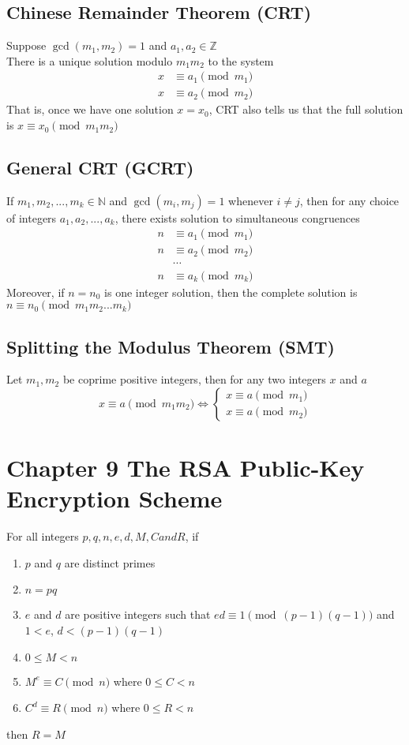 \documentclass[12pt, letterpaper]{article}
\begin{document}
\subsection{Chinese Remainder Theorem (CRT)}
Suppose $\gcd(m_1, m_2) = 1$ and $a_1, a_2 \in \mathbb{Z}$ \\
There is a unique solution modulo $m_1m_2$ to the system 
\begin{align*}
    x &\equiv a_1 \pmod{m_1} \\
    x &\equiv a_2 \pmod{m_2}
\end{align*}
That is, once we have one solution $x = x_0$, CRT also tells us that the full solution is $x \equiv x_0 \pmod{m_1m_2}$
\subsection{General CRT (GCRT)}
If $m_1, m_2, ... , m_k \in \mathbb{N}$ and $\gcd(m_i, m_j) = 1$ whenever $i \neq j$, then for any choice of integers 
$a_1, a_2, ... , a_k$, there exists solution to simultaneous congruences
\begin{align*}
    n &\equiv a_1 \pmod{m_1} \\
    n &\equiv a_2 \pmod{m_2} \\
    &\cdots \\
    n &\equiv a_k \pmod{m_k}
\end{align*}
Moreover, if $n = n_0$ is one integer solution, then the complete solution is $n \equiv n_0 \pmod{m_1m_2...m_k}$
\subsection{Splitting the Modulus Theorem (SMT)}
Let $m_1, m_2$ be coprime positive integers, then for any two integers $x$ and $a$
$$
x \equiv a \pmod{m_1m_2} \Longleftrightarrow
\begin{cases}
    x \equiv a \pmod{m_1} \\
    x \equiv a \pmod{m_2}
\end{cases}
$$

\section{Chapter 9 The RSA Public-Key Encryption Scheme}
For all integers $p, q, n, e, d, M, C and R$, if 
\begin{enumerate}
    \item $p$ and $q$ are distinct primes 
    \item $n = pq$
    \item $e$ and $d$ are positive integers such that $ed \equiv 1 \pmod{(p-1)(q-1)}$ and $1 < e$, $d < (p-1)(q-1)$
    \item $0 \leq M < n$
    \item $M^e \equiv C \pmod{n}$ where $0 \leq C < n$
    \item $C^d \equiv R \pmod{n}$ where $0 \leq R < n$
\end{enumerate}
then $R = M$
\end{document}

